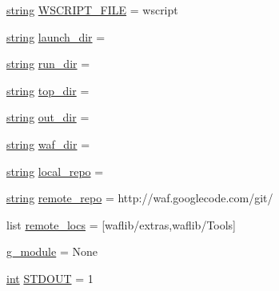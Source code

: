 \begin{DoxyCompactItemize}
\item 
\hyperlink{test__lib_f_l_a_c_2format_8c_ab02026ad0de9fb6c1b4233deb0a00c75}{string} \hyperlink{namespacewaflib_1_1_context_a72aecfa9a0be747d8b1874bd467b5ec3}{W\+S\+C\+R\+I\+P\+T\+\_\+\+F\+I\+LE} = \textquotesingle{}wscript\textquotesingle{}
\item 
\hyperlink{test__lib_f_l_a_c_2format_8c_ab02026ad0de9fb6c1b4233deb0a00c75}{string} \hyperlink{namespacewaflib_1_1_context_a684b0d17ca2e737ac09513ea6aac56e1}{launch\+\_\+dir} = \textquotesingle{}\textquotesingle{}
\item 
\hyperlink{test__lib_f_l_a_c_2format_8c_ab02026ad0de9fb6c1b4233deb0a00c75}{string} \hyperlink{namespacewaflib_1_1_context_a13e013edfa0d82c62cf7e1a90176c933}{run\+\_\+dir} = \textquotesingle{}\textquotesingle{}
\item 
\hyperlink{test__lib_f_l_a_c_2format_8c_ab02026ad0de9fb6c1b4233deb0a00c75}{string} \hyperlink{namespacewaflib_1_1_context_a58935e55304cd0922f2d486af1a0e819}{top\+\_\+dir} = \textquotesingle{}\textquotesingle{}
\item 
\hyperlink{test__lib_f_l_a_c_2format_8c_ab02026ad0de9fb6c1b4233deb0a00c75}{string} \hyperlink{namespacewaflib_1_1_context_a72b92243377c1a48e548ddb3c388f4d5}{out\+\_\+dir} = \textquotesingle{}\textquotesingle{}
\item 
\hyperlink{test__lib_f_l_a_c_2format_8c_ab02026ad0de9fb6c1b4233deb0a00c75}{string} \hyperlink{namespacewaflib_1_1_context_a2960ec8049264f2fbb6c3fd8917aab90}{waf\+\_\+dir} = \textquotesingle{}\textquotesingle{}
\item 
\hyperlink{test__lib_f_l_a_c_2format_8c_ab02026ad0de9fb6c1b4233deb0a00c75}{string} \hyperlink{namespacewaflib_1_1_context_a64aa02f396d01c056ddf1c0562e72aaa}{local\+\_\+repo} = \textquotesingle{}\textquotesingle{}
\item 
\hyperlink{test__lib_f_l_a_c_2format_8c_ab02026ad0de9fb6c1b4233deb0a00c75}{string} \hyperlink{namespacewaflib_1_1_context_a24399655c41f1c6ccf9a50c5cb6c5222}{remote\+\_\+repo} = \textquotesingle{}http\+://waf.\+googlecode.\+com/git/\textquotesingle{}
\item 
list \hyperlink{namespacewaflib_1_1_context_a008d2c01e7118c0aa0e34814022da195}{remote\+\_\+locs} = \mbox{[}\textquotesingle{}waflib/extras\textquotesingle{},\textquotesingle{}waflib/Tools\textquotesingle{}\mbox{]}
\item 
\hyperlink{namespacewaflib_1_1_context_a34e32dcf837b42ef03d8caf4cf19240c}{g\+\_\+module} = None
\item 
\hyperlink{xmltok_8h_a5a0d4a5641ce434f1d23533f2b2e6653}{int} \hyperlink{namespacewaflib_1_1_context_a5e102a9589db85ceb3efea609c9fe0ea}{S\+T\+D\+O\+UT} = 1

\end{DoxyCompactItemize}

